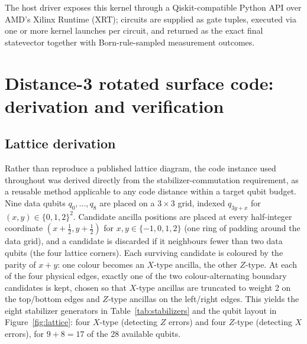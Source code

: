\documentclass[pdflatex,sn-mathphys,Numbered]{sn-jnl}
\begin{document}
The host driver exposes this kernel through a Qiskit-compatible Python API over AMD's Xilinx Runtime (XRT); circuits are supplied as gate tuples, executed via one or more kernel launches per circuit, and returned as the exact final statevector together with Born-rule-sampled measurement outcomes.

\section{Distance-3 rotated surface code: derivation and verification}\label{sec:code}

\subsection{Lattice derivation}

Rather than reproduce a published lattice diagram, the code instance used throughout was derived directly from the stabilizer-commutation requirement, as a reusable method applicable to any code distance within a target qubit budget. Nine data qubits $q_{0},\dots,q_{8}$ are placed on a $3\times3$ grid, indexed $q_{3y+x}$ for $(x,y)\in\{0,1,2\}^{2}$. Candidate ancilla positions are placed at every half-integer coordinate $(x+\tfrac12,y+\tfrac12)$ for $x,y\in\{-1,0,1,2\}$ (one ring of padding around the data grid), and a candidate is discarded if it neighbours fewer than two data qubits (the four lattice corners). Each surviving candidate is coloured by the parity of $x+y$: one colour becomes an $X$-type ancilla, the other $Z$-type. At each of the four physical edges, exactly one of the two colour-alternating boundary candidates is kept, chosen so that $X$-type ancillas are truncated to weight 2 on the top/bottom edges and $Z$-type ancillas on the left/right edges. This yields the eight stabilizer generators in Table~\ref{tab:stabilizers} and the qubit layout in Figure~\ref{fig:lattice}: four $X$-type (detecting $Z$ errors) and four $Z$-type (detecting $X$ errors), for $9+8=17$ of the 28 available qubits.
\end{document}
